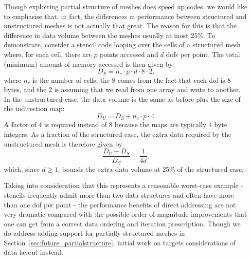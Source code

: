Though exploiting partial structure of meshes does speed up codes, we would like to emphasise that, in fact, the differences in performance between structured and unstructured meshes is not actually that great.
The reason for this is that the difference in data volume between the meshes usually at most 25\%.
To demonstrate, consider a stencil code looping over the cells of a structured mesh where, for each cell, there are $p$ points accessed and $d$ \glspl{dof} per point.
The total (minimum) amount of memory accessed is then given by
\begin{equation*}
  D_S = n_c \cdot p \cdot d \cdot 8 \cdot 2,
\end{equation*}
where $n_c$ is the number of cells, the 8 comes from the fact that each \gls{dof} is 8 bytes, and the 2 is assuming that we read from one array and write to another.
In the unstructured case, the data volume is the same as before plus the size of the indirection map:
\begin{equation*}
  D_U = D_S + n_c \cdot p \cdot 4.
\end{equation*}
A factor of 4 is required instead of 8 because the maps are typically 4 byte integers.
As a fraction of the structured case, the extra data required by the unstructured mesh is therefore given by
\begin{equation*}
  \frac{D_U - D_S}{D_S} = \frac{1}{4d},
\end{equation*}
which, since $d \geq 1$, bounds the extra data volume at 25\% of the structured case.

Taking into consideration that this represents a reasonable worst-case example - stencils frequently admit more than two data structures and often have more than one \gls{dof} per point - the performance benefits of direct addressing are not very dramatic compared with the possible order-of-magnitude improvements that one can get from a correct data ordering and iteration prescription.
Though we do address adding support for partially-structured meshes in Section~\ref{sec:future_partialstructure}, initial work on  targets considerations of data layout instead.
